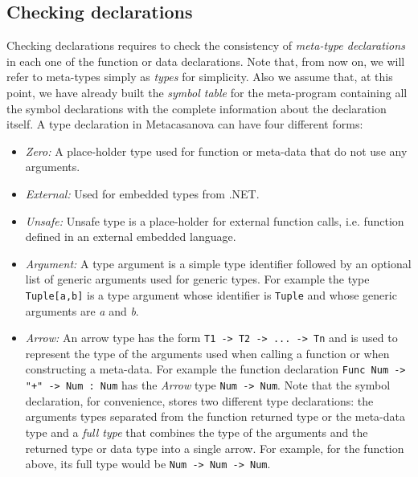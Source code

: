 \subsection{Checking declarations}
\label{subsec:ch_metacasanova_checking_declarations}
Checking declarations requires to check the consistency of \textit{meta-type declarations} in each one of the function or data declarations. Note that, from now on, we will refer to meta-types simply as \textit{types} for simplicity. Also we assume that, at this point, we have already built the \textit{symbol table} for the meta-program containing all the symbol declarations with the complete information about the declaration itself. A type declaration in Metacasanova can have four different forms:

\begin{itemize}
	\item \textit{Zero:} A place-holder type used for function or meta-data that do not use any arguments.
	
	\item \textit{External:} Used for embedded types from .NET.
	
	\item \textit{Unsafe:} Unsafe type is a place-holder for external function calls, i.e. function defined in an external embedded language.
	
	\item \textit{Argument:} A type argument is a simple type identifier followed by an optional list of generic arguments used for generic types. For example the type \texttt{Tuple[a,b]} is a type argument whose identifier is \texttt{Tuple} and whose generic arguments are \textit{a} and \textit{b}.
	
	\item \textit{Arrow:} An arrow type has the form \texttt{T1 -> T2 -> ... -> Tn} and is used to represent the type of the arguments used when calling a function or when constructing a meta-data. For example the function declaration \texttt{Func Num -> "+" -> Num : Num} has the \textit{Arrow} type \texttt{Num -> Num}. Note that the symbol declaration, for convenience, stores two different type declarations: the arguments types separated from the function returned type or the meta-data type and a \textit{full type} that combines the type of the arguments and the returned type or data type into a single arrow. For example, for the function above, its full type would be \texttt{Num -> Num -> Num}.
\end{itemize}


